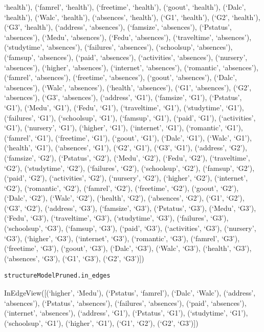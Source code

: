 \documentclass[
]{article}
\begin{document}
`health'), (`famrel', `health'), (`freetime', `health'), (`goout',
`health'), (`Dalc', `health'), (`Walc', `health'), (`absences',
`health'), (`G1', `health'), (`G2', `health'), (`G3', `health'),
(`address', `absences'), (`famsize', `absences'), (`Pstatus',
`absences'), (`Medu', `absences'), (`Fedu', `absences'), (`traveltime',
`absences'), (`studytime', `absences'), (`failures', `absences'),
(`schoolsup', `absences'), (`famsup', `absences'), (`paid', `absences'),
(`activities', `absences'), (`nursery', `absences'), (`higher',
`absences'), (`internet', `absences'), (`romantic', `absences'),
(`famrel', `absences'), (`freetime', `absences'), (`goout', `absences'),
(`Dalc', `absences'), (`Walc', `absences'), (`health', `absences'),
(`G1', `absences'), (`G2', `absences'), (`G3', `absences'), (`address',
`G1'), (`famsize', `G1'), (`Pstatus', `G1'), (`Medu', `G1'), (`Fedu',
`G1'), (`traveltime', `G1'), (`studytime', `G1'), (`failures', `G1'),
(`schoolsup', `G1'), (`famsup', `G1'), (`paid', `G1'), (`activities',
`G1'), (`nursery', `G1'), (`higher', `G1'), (`internet', `G1'),
(`romantic', `G1'), (`famrel', `G1'), (`freetime', `G1'), (`goout',
`G1'), (`Dalc', `G1'), (`Walc', `G1'), (`health', `G1'), (`absences',
`G1'), (`G2', `G1'), (`G3', `G1'), (`address', `G2'), (`famsize', `G2'),
(`Pstatus', `G2'), (`Medu', `G2'), (`Fedu', `G2'), (`traveltime', `G2'),
(`studytime', `G2'), (`failures', `G2'), (`schoolsup', `G2'), (`famsup',
`G2'), (`paid', `G2'), (`activities', `G2'), (`nursery', `G2'),
(`higher', `G2'), (`internet', `G2'), (`romantic', `G2'), (`famrel',
`G2'), (`freetime', `G2'), (`goout', `G2'), (`Dalc', `G2'), (`Walc',
`G2'), (`health', `G2'), (`absences', `G2'), (`G1', `G2'), (`G3', `G2'),
(`address', `G3'), (`famsize', `G3'), (`Pstatus', `G3'), (`Medu', `G3'),
(`Fedu', `G3'), (`traveltime', `G3'), (`studytime', `G3'), (`failures',
`G3'), (`schoolsup', `G3'), (`famsup', `G3'), (`paid', `G3'),
(`activities', `G3'), (`nursery', `G3'), (`higher', `G3'), (`internet',
`G3'), (`romantic', `G3'), (`famrel', `G3'), (`freetime', `G3'),
(`goout', `G3'), (`Dalc', `G3'), (`Walc', `G3'), (`health', `G3'),
(`absences', `G3'), (`G1', `G3'), (`G2', `G3'){]})

\begin{verbatim}
structureModelPruned.in_edges
\end{verbatim}

InEdgeView({[}(`higher', `Medu'), (`Pstatus', `famrel'), (`Dalc',
`Walc'), (`address', `absences'), (`Pstatus', `absences'), (`failures',
`absences'), (`paid', `absences'), (`internet', `absences'), (`address',
`G1'), (`Pstatus', `G1'), (`studytime', `G1'), (`schoolsup', `G1'),
(`higher', `G1'), (`G1', `G2'), (`G2', `G3'){]})
\end{document}
